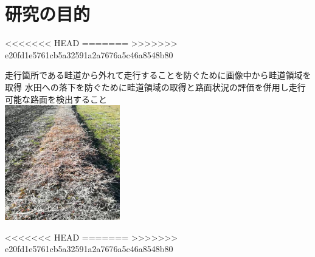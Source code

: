 \chapter{研究の目的}\label{chap:purpose}
<<<<<<< HEAD
=======
>>>>>>> e20fd1e5761cb5a32591a2a7676a5c46a8548b80

走行箇所である畦道から外れて走行することを防ぐために画像中から畦道領域を取得
水田への落下を防ぐために畦道領域の取得と路面状況の評価を併用し走行可能な路面を検出すること
\\
\includegraphics[width=5cm]{figs/fig1.jpg}

<<<<<<< HEAD
=======
>>>>>>> e20fd1e5761cb5a32591a2a7676a5c46a8548b80
